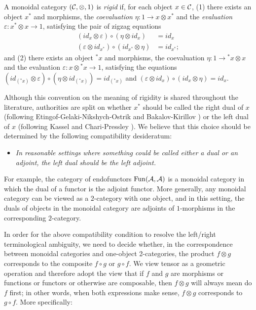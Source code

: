 \documentclass{amsart}
\begin{document}
\begin{definition} \label{def:rigid}
	A monoidal category $(\mathcal C, \otimes, 1)$ is {\em rigid} if, for each object $x \in \mathcal C$, (1) there exists an object $x^*$ and morphisms, the {\em coevaluation} $\eta: 1 \to x \otimes x^*$ and the {\em evaluation} $\varepsilon: x^* \otimes x \to 1$, satisfying the pair of zigzag equations
	\begin{align*}
		(id_{x} \otimes \varepsilon  ) \circ (  \eta \otimes id_{x}) &= id_{x} \\
		(\varepsilon \otimes id_{x^*}) \circ (id_{x^*} \otimes \eta) &= id_{x^*};
	\end{align*}
and (2) there exists an object ${}^* x$ and morphisms,
the coevaluation $\eta: 1 \to {}^* x \otimes x$ and the evaluation $\varepsilon: x \otimes {}^* x \to 1$, satisfying the equations
$		(id_{({}^* x)} \otimes \varepsilon  ) \circ (  \eta \otimes id_{({}^* x)}) = id_{({}^* x)}$
and $		(\varepsilon \otimes id_{x}) \circ (id_{x} \otimes \eta) = id_{x}.$
\end{definition}

Although this convention on the meaning of rigidity is shared throughout the literature, authorities are split on whether $x^*$ should be called the right dual of $x$ (following Etingof-Gelaki-Nikshych-Ostrik \cite{EGNO} and Bakalov-Kirillov \cite{MR1797619})  or the left dual of $x$ (following Kassel \cite{MR1321145} and Chari-Pressley \cite{MR1358358}).  We believe that this choice should be determined by the following compatibility desideratum: 
\begin{itemize}
\item[]
	\emph{In reasonable settings where something could be called either a dual or an adjoint, the left dual should be the left adjoint.}
\end{itemize}

\nid For example, the category of endofunctors $\operatorname{Fun}(\mathcal A, \mathcal A)$ is a monoidal category in which the dual of a functor is the adjoint functor.  More generally, any monoidal category can be viewed as a $2$-category with one object, and in this setting, the duals of objects in the monoidal category are adjoints of $1$-morphisms in the corresponding $2$-category.  

In order for the above compatibility condition to resolve the left/right terminological ambiguity, we need to decide whether, in the correspondence between monoidal categories and one-object 2-categories, the product $f \otimes g$ corresponds to the composite $f \circ g$ or $g \circ f$.  We view tensor as a geometric operation and therefore adopt the view that if $f$ and $g$ are morphisms or functions or functors or otherwise are composable, then $f \otimes g$ will always mean do $f$ first; in other words, when both expressions make sense, $f \otimes g$ corresponds to $g \circ f$.  More specifically:
\end{document}
